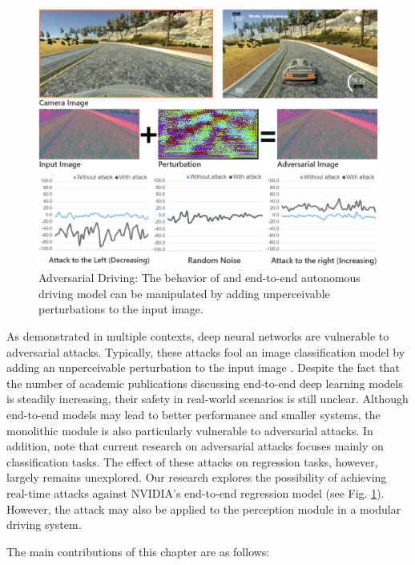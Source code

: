 \begin{figure}[H]
    \centering
    \includegraphics[width=\textwidth]{figures/chapter_driving/overview.png}
    \caption{Adversarial Driving: The behavior of and end-to-end autonomous driving model can be manipulated by adding unperceivable perturbations to the input image.}
    \label{fig:adv_drv}
\end{figure} 

As demonstrated in multiple contexts, deep neural networks are vulnerable to adversarial attacks. Typically, these attacks fool an image classification model by adding an unperceivable perturbation to the input image \citep{GoodfellowSS14}. Despite the fact that the number of academic publications discussing end-to-end deep learning models is steadily increasing, their safety in real-world scenarios is still unclear. Although end-to-end models may lead to better performance and smaller systems, the monolithic module is also particularly vulnerable to adversarial attacks. In addition, note that current research on adversarial attacks focuses mainly on classification tasks. The effect of these attacks on regression tasks, however, largely remains unexplored. Our research explores the possibility of achieving real-time attacks against NVIDIA's end-to-end regression model (see Fig. \ref{fig:adv_drv}). However, the attack may also be applied to the perception module in a modular driving system.


The main contributions of this chapter are as follows: 

